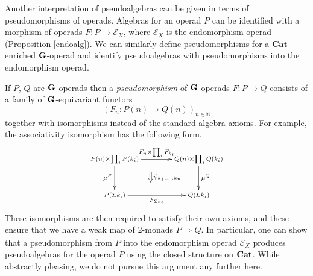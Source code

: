 \begin{rem}
Another interpretation of pseudoalgebras can be given in terms of pseudomorphisms of operads. Algebras for an operad $P$ can be identified with a morphism of operads $F \colon P \rightarrow \mathcal{E}_X$, where $\mathcal{E}_X$ is the endomorphism operad (Proposition \ref{endoalg}). We can similarly define pseudomorphisms for a $\mathbf{Cat}$-enriched $\mathbf{G}$-operad and identify pseudoalgebras with pseudomorphisms into the endomorphism operad.

If $P$, $Q$ are $\mathbf{G}$-operads then a \textit{pseudomorphism} of $\mathbf{G}$-operads $F \colon P \rightarrow Q$ consists of a family of $\mathbf{G}$-equivariant functors
            \[
                \left(F_n \colon P(n) \rightarrow Q(n)\right)_{n \in \mathbb{N}}
            \]
together with isomorphisms instead of the standard algebra axioms.  For example, the associativity isomorphism has the following form.
            \[
                \xy
                    (0,0)*+{\scriptstyle P(n) \times \prod_i P(k_i)}="00";
                    (35,0)*+{\scriptstyle Q(n) \times \prod_i Q(k_i)}="10";
                    (0,-15)*+{\scriptstyle P(\Sigma k_i)}="01";
                    (35,-15)*+{\scriptstyle Q(\Sigma k_i)}="11";
                    {\ar^{F_n \times \prod_i F_{k_i}} "00" ; "10"};
                    {\ar^{\mu^Q} "10" ; "11"};
                    {\ar_{\mu^P} "00" ; "01"};
                    {\ar_{F_{\Sigma k_i}} "01" ; "11"};
                    {\ar@{=>}^{\psi_{k_1,\ldots,k_n}} (15,-5.5) ; (15,-9.5)};
                \endxy
            \]
These isomorphisms are then required to satisfy their own axioms, and these ensure that we have a weak map of 2-monads $\underline{P} \Rightarrow \underline{Q}$.  In particular, one can show that a pseudomorphism from $P$ into the endomorphism operad $\mathcal{E}_X$ produces pseudoalgebras for the operad $P$ using the closed structure on $\mathbf{Cat}$.  While abstractly pleasing, we do not pursue this argument any further here.
\end{rem}





